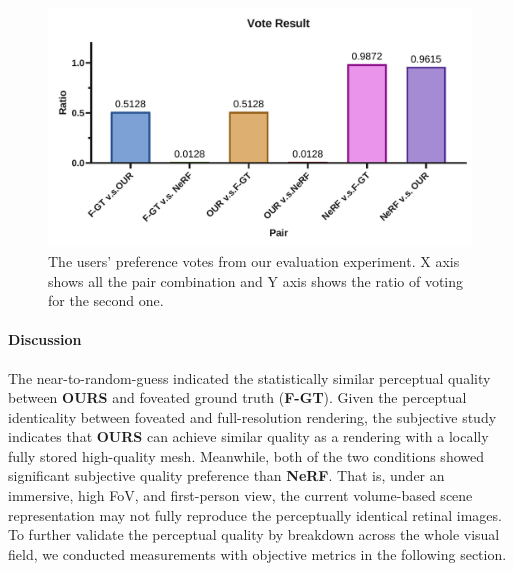 
\begin{figure}[htb]
    \centering
    \includegraphics[width=0.96\linewidth]{TOG/figs/vote.pdf}
    \caption{The users' preference votes from our evaluation experiment. X axis shows all the pair combination and Y axis shows the ratio of voting for the second one.}
    \label{fig:results:2afc}
\end{figure}

\paragraph{Discussion}
The near-to-random-guess indicated the statistically similar perceptual quality between {\bf OURS} and foveated ground truth ({\bf F-GT}). 
Given the perceptual identicality between foveated and full-resolution rendering, the subjective study indicates that {\bf OURS} can achieve similar quality as a rendering with a locally fully stored high-quality mesh.
Meanwhile, both of the two conditions showed significant subjective quality preference than {\bf NeRF}. That is, under an immersive, high FoV, and first-person view, the current volume-based scene representation may not fully reproduce the perceptually identical retinal images.
To further validate the perceptual quality by breakdown across the whole visual field, we conducted measurements with objective metrics in the following section.

